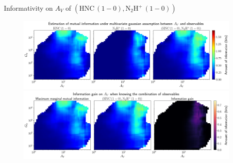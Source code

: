 \documentclass{beamer}
\begin{document}
\begin{frame}{Informativity on $A_V$ of $\left(\mathrm{HNC\,(1-0)},\mathrm{N_2H^+\,(1-0)}\right)$}
    \begin{figure}
        \centering
        \includegraphics[width=0.95\linewidth]{../linearinfogauss/av__hnc10_n2hp10_linearinfogauss.png}
        \vfill
        \includegraphics[width=0.95\linewidth]{../linearinfogauss/av__hnc10_n2hp10_linearinfogauss_gain.png}
    \end{figure}
\end{frame}
\end{document}
